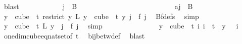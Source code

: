 \begin{isabellebody}
\ blast\isanewline
\ \ \ \ \ \ \ \ \ \ \isamarkupfalse%
\ {\isachardoublequoteopen}j\ {\isasymnotin}\ B\ {}{\isachardoublequoteclose}\isanewline
\ \ \ \ \ \ \ \ \ \ \isamarkupfalse%
\ \isanewline
\ \ \ \ \ \ \ \ \ \ \ \ \isamarkupfalse%
\ a{\isacharcolon}{\kern0pt}{\isachardoublequoteopen}j\ {\isasymin}\ B\ {}{\isachardoublequoteclose}\isanewline
\ \ \ \ \ \ \ \ \ \ \ \ \isamarkupfalse%
\ \isamarkupfalse%
\ {\isachardoublequoteopen}{\isacharparenleft}{\kern0pt}{\isasymforall}y\ {\isasymin}\ cube\ {}\ t{\isachardot}{\kern0pt}\ {\isacharparenleft}{\kern0pt}restrict\ {\isacharparenleft}{\kern0pt}{\isasymlambda}y{\isachardot}{\kern0pt}\ L\ {\isacharparenleft}{\kern0pt}y\ {}{\isacharparenright}{\kern0pt}{\isacharparenright}{\kern0pt}\ {\isacharparenleft}{\kern0pt}cube\ {}\ t{\isacharparenright}{\kern0pt}{\isacharparenright}{\kern0pt}\ y\ j\ {\isacharequal}{\kern0pt}\ f\ j{\isacharparenright}{\kern0pt}{\isachardoublequoteclose}\ \isamarkupfalse%
\ Bf{\isacharunderscore}{\kern0pt}defs\ \isamarkupfalse%
\ simp\isanewline
\ \ \ \ \ \ \ \ \ \ \ \ \isamarkupfalse%
\ \isamarkupfalse%
\ {\isachardoublequoteopen}{\isasymforall}y\ {\isasymin}\ cube\ {}\ t{\isachardot}{\kern0pt}\ L\ {\isacharparenleft}{\kern0pt}y\ {}{\isacharparenright}{\kern0pt}\ j\ {\isacharequal}{\kern0pt}\ f\ j{\isachardoublequoteclose}\ \isamarkupfalse%
\ simp\isanewline
\ \ \ \ \ \ \ \ \ \ \ \ \isamarkupfalse%
\ \isamarkupfalse%
\ {\isachardoublequoteopen}{\isasymforall}y\ {\isasymin}\ cube\ {}\ t{\isachardot}{\kern0pt}\ {\isacharparenleft}{\kern0pt}{\isasymexists}{\isacharbang}{\kern0pt}i{\isachardot}{\kern0pt}\ i\ {\isacharless}{\kern0pt}\ t\ {\isasymand}\ y\ {}\ {\isacharequal}{\kern0pt}\ i{\isacharparenright}{\kern0pt}{\isachardoublequoteclose}\ \isamarkupfalse%
\ one{\isacharunderscore}{\kern0pt}dim{\isacharunderscore}{\kern0pt}cube{\isacharunderscore}{\kern0pt}eq{\isacharunderscore}{\kern0pt}nat{\isacharunderscore}{\kern0pt}set{\isacharbrackleft}{\kern0pt}of\ {\isachardoublequoteopen}t{\isachardoublequoteclose}{\isacharbrackright}{\kern0pt}\ \isamarkupfalse%
\ bij{\isacharunderscore}{\kern0pt}betw{\isacharunderscore}{\kern0pt}def\ \isamarkupfalse%
\ blast\isanewline
\ \ \ \ \ \ \ \ \ \ \ \ \isamarkupfalse%

\end{isabellebody}
